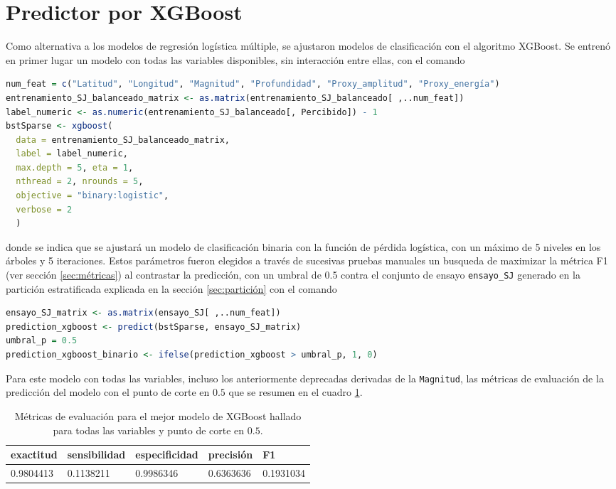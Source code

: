 \documentclass[a4paper]{report}
\begin{document}
\section{Predictor por XGBoost}
Como alternativa a los modelos de regresión logística múltiple, se ajustaron modelos de clasificación con el algoritmo XGBoost.
Se entrenó en primer lugar un modelo con todas las variables disponibles, sin interacción entre ellas, con el comando
\begin{lstlisting}[language=R, breaklines=true]
num_feat = c("Latitud", "Longitud", "Magnitud", "Profundidad", "Proxy_amplitud", "Proxy_energía")
entrenamiento_SJ_balanceado_matrix <- as.matrix(entrenamiento_SJ_balanceado[ ,..num_feat])
label_numeric <- as.numeric(entrenamiento_SJ_balanceado[, Percibido]) - 1
bstSparse <- xgboost(
  data = entrenamiento_SJ_balanceado_matrix, 
  label = label_numeric, 
  max.depth = 5, eta = 1, 
  nthread = 2, nrounds = 5, 
  objective = "binary:logistic", 
  verbose = 2
  )
\end{lstlisting}
donde se indica que se ajustará un modelo de clasificación binaria con la función de pérdida logística, con un máximo de 5 niveles en los árboles y 5 iteraciones.
Estos parámetros fueron elegidos a través de sucesivas pruebas manuales un busqueda de maximizar la métrica F1 (ver sección \ref{sec:métricas}) al contrastar la predicción, con un umbral de \num{0.5} contra el conjunto de ensayo \verb'ensayo_SJ' generado en la partición estratificada explicada en la sección \ref{sec:partición} con el comando
\begin{lstlisting}[language=R, breaklines=true]
ensayo_SJ_matrix <- as.matrix(ensayo_SJ[ ,..num_feat])
prediction_xgboost <- predict(bstSparse, ensayo_SJ_matrix)
umbral_p = 0.5
prediction_xgboost_binario <- ifelse(prediction_xgboost > umbral_p, 1, 0)
\end{lstlisting}
Para este modelo con todas las variables, incluso los anteriormente deprecadas derivadas de la \verb'Magnitud', las métricas de evaluación de la predicción del modelo con el punto de corte en \(0.5\) que se resumen en el cuadro \ref{tab:xgboost_metrics}.
\begin{table}[!ht]
	\centering
	\begin{tabular}{lllll}
	\toprule
	exactitud & sensibilidad & especificidad & precisión & F1 \\
	\midrule
	\num{0.9804413} & \num{0.1138211} & \num{0.9986346} & \num{0.6363636} & \num{0.1931034} \\
	\bottomrule
	\end{tabular}
	\caption{Métricas de evaluación para el mejor modelo de XGBoost hallado para todas las variables y punto de corte en \(0.5\).}
	\label{tab:xgboost_metrics}
\end{table}
\end{document}
